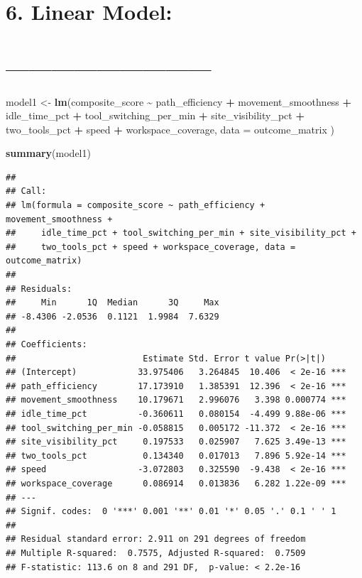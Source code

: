 \documentclass[
]{article}
\newenvironment{Shaded}{\begin{snugshade}}{\end{snugshade}}
\newcommand{\AttributeTok}[1]{\textcolor[rgb]{0.13,0.29,0.53}{#1}}
\newcommand{\FunctionTok}[1]{\textcolor[rgb]{0.13,0.29,0.53}{\textbf{#1}}}
\newcommand{\NormalTok}[1]{#1}
\newcommand{\OtherTok}[1]{\textcolor[rgb]{0.56,0.35,0.01}{#1}}
\newcommand{\SpecialCharTok}[1]{\textcolor[rgb]{0.81,0.36,0.00}{\textbf{#1}}}
\begin{document}
\section{6. Linear Model:}\label{linear-model}

\section{---------------------------}\label{section-1}

\begin{Shaded}
\begin{Highlighting}[]
\NormalTok{model1 }\OtherTok{\textless{}{-}} \FunctionTok{lm}\NormalTok{(composite\_score }\SpecialCharTok{\textasciitilde{}}\NormalTok{ path\_efficiency }\SpecialCharTok{+}
\NormalTok{               movement\_smoothness }\SpecialCharTok{+}
\NormalTok{               idle\_time\_pct }\SpecialCharTok{+}
\NormalTok{               tool\_switching\_per\_min }\SpecialCharTok{+}
\NormalTok{               site\_visibility\_pct }\SpecialCharTok{+}
\NormalTok{               two\_tools\_pct }\SpecialCharTok{+}
\NormalTok{               speed }\SpecialCharTok{+}
\NormalTok{               workspace\_coverage,}
             \AttributeTok{data =}\NormalTok{ outcome\_matrix )}

\FunctionTok{summary}\NormalTok{(model1)}
\end{Highlighting}
\end{Shaded}

\begin{verbatim}
## 
## Call:
## lm(formula = composite_score ~ path_efficiency + movement_smoothness + 
##     idle_time_pct + tool_switching_per_min + site_visibility_pct + 
##     two_tools_pct + speed + workspace_coverage, data = outcome_matrix)
## 
## Residuals:
##     Min      1Q  Median      3Q     Max 
## -8.4306 -2.0536  0.1121  1.9984  7.6329 
## 
## Coefficients:
##                         Estimate Std. Error t value Pr(>|t|)    
## (Intercept)            33.975406   3.264845  10.406  < 2e-16 ***
## path_efficiency        17.173910   1.385391  12.396  < 2e-16 ***
## movement_smoothness    10.179671   2.996076   3.398 0.000774 ***
## idle_time_pct          -0.360611   0.080154  -4.499 9.88e-06 ***
## tool_switching_per_min -0.058815   0.005172 -11.372  < 2e-16 ***
## site_visibility_pct     0.197533   0.025907   7.625 3.49e-13 ***
## two_tools_pct           0.134340   0.017013   7.896 5.92e-14 ***
## speed                  -3.072803   0.325590  -9.438  < 2e-16 ***
## workspace_coverage      0.086914   0.013836   6.282 1.22e-09 ***
## ---
## Signif. codes:  0 '***' 0.001 '**' 0.01 '*' 0.05 '.' 0.1 ' ' 1
## 
## Residual standard error: 2.911 on 291 degrees of freedom
## Multiple R-squared:  0.7575, Adjusted R-squared:  0.7509 
## F-statistic: 113.6 on 8 and 291 DF,  p-value: < 2.2e-16
\end{verbatim}
\end{document}
